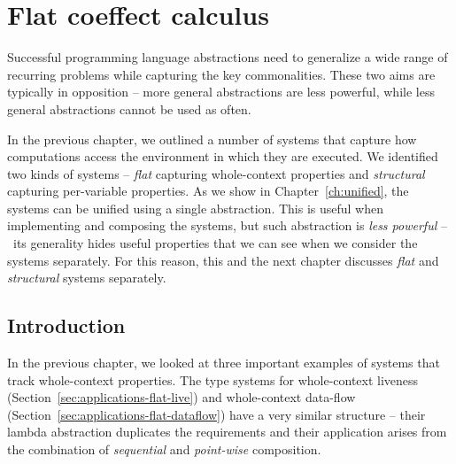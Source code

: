 

\chapter{Flat coeffect calculus} 
\label{ch:flat} 

Successful programming language abstractions need to generalize a wide range of recurring
problems while capturing the key commonalities. These two aims are typically in opposition -- 
more general abstractions are less powerful, while less general abstractions cannot be
used as often.

In the previous chapter, we outlined a number of systems that capture how computations
access the environment in which they are executed. We identified two kinds of systems --
\emph{flat} capturing whole-context properties and \emph{structural} capturing per-variable
properties. As we show in Chapter~\ref{ch:unified}, the systems can be unified using a single 
abstraction. This is useful when implementing and composing the systems, but such abstraction 
is  \emph{less powerful} -- \ie~its generality hides useful properties that we can see 
when we consider the systems separately. For this reason, this and the next chapter discusses 
\emph{flat} and \emph{structural} systems separately.


\section{Introduction}
\label{sec:flat-intro}

In the previous chapter, we looked at three important examples of systems that track whole-context 
properties. The type systems for whole-context liveness (Section~\ref{sec:applications-flat-live}) 
and whole-context data-flow (Section~\ref{sec:applications-flat-dataflow}) have a very similar 
structure -- their lambda abstraction duplicates the requirements and their application arises
from the combination of \emph{sequential} and \emph{point-wise} composition.

